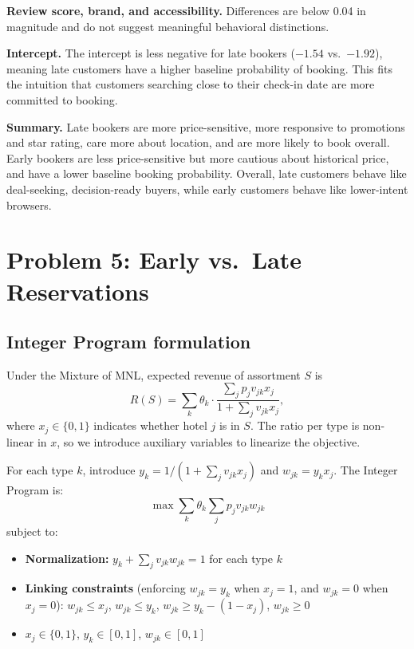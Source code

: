 \documentclass[11pt]{article}
\begin{document}
\textbf{Review score, brand, and accessibility.} Differences are below 0.04 in magnitude and do not suggest meaningful behavioral distinctions.

\textbf{Intercept.} The intercept is less negative for late bookers ($-1.54$ vs.\ $-1.92$), meaning late customers have a higher baseline probability of booking. This fits the intuition that customers searching close to their check-in date are more committed to booking.

\textbf{Summary.} Late bookers are more price-sensitive, more responsive to promotions and star rating, care more about location, and are more likely to book overall. Early bookers are less price-sensitive but more cautious about historical price, and have a lower baseline booking probability. Overall, late customers behave like deal-seeking, decision-ready buyers, while early customers behave like lower-intent browsers.

\section{Problem 5: Early vs.\ Late Reservations}

\subsection*{Integer Program formulation}

Under the Mixture of MNL, expected revenue of assortment $S$ is
\[
R(S) = \sum_k \theta_k \cdot \frac{\displaystyle\sum_j p_j v_{jk} x_j}{1 + \displaystyle\sum_j v_{jk} x_j},
\]
where $x_j \in \{0,1\}$ indicates whether hotel $j$ is in $S$. The ratio per type is non-linear in $x$, so we introduce auxiliary variables to linearize the objective.

For each type $k$, introduce $y_k = 1 / (1 + \sum_j v_{jk} x_j)$ and $w_{jk} = y_k x_j$. The Integer Program is:
\[
\max \sum_k \theta_k \sum_j p_j v_{jk} w_{jk}
\]
subject to:
\begin{itemize}
  \item \textbf{Normalization:} $y_k + \sum_j v_{jk} w_{jk} = 1$ for each type $k$
  \item \textbf{Linking constraints} (enforcing $w_{jk} = y_k$ when $x_j = 1$, and $w_{jk} = 0$ when $x_j = 0$): $w_{jk} \le x_j$,\; $w_{jk} \le y_k$,\; $w_{jk} \ge y_k - (1 - x_j)$,\; $w_{jk} \ge 0$
  \item $x_j \in \{0,1\}$,\; $y_k \in [0,1]$,\; $w_{jk} \in [0,1]$
\end{itemize}
\end{document}
